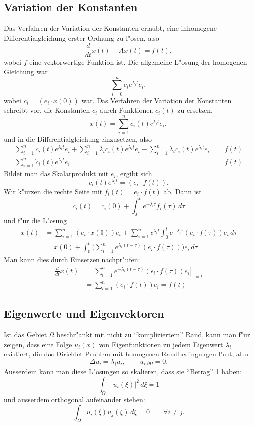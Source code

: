 \subsection{Variation der Konstanten}
Das Verfahren der Variation der Konstanten erlaubt, eine inhomogene
Differentialgleichung erster Ordnung zu l"osen, also
\[
\frac{d}{dt}x(t)-Ax(t)=f(t),
\]
wobei $f$ eine vektorwertige Funktion ist.
Die allgemeine L"osung der homogenen Gleichung war
\[
\sum_{i=0}^nc_ie^{\lambda_i t}e_i,
\]
wobei $c_i=(e_i\cdot x(0))$ war.
Das Verfahren der Variation der Konstanten schreibt vor, die Konstanten
$c_i$ durch Funktionen $c_i(t)$ zu ersetzen,
\[
x(t)=\sum_{i=1}^nc_i(t)e^{\lambda_it}e_i,
\]
und in die Differentialgleichung
einzusetzen, also
\begin{align*}
\sum_{i=1}^n\dot c_i(t)e^{\lambda_it}e_i
+
\sum_{i=1}^n\lambda_i c_i(t)e^{\lambda_it}e_i
-\sum_{i=1}^n\lambda_i c_i(t)e^{\lambda_it}e_i
&=
f(t)
\\
\sum_{i=1}^n\dot c_i(t)e^{\lambda_it}e_i
&=
f(t)
\end{align*}
Bildet man das Skalarprodukt mit $e_i$, ergibt sich 
\[
\dot c_i(t)e^{\lambda_i t}=(e_i\cdot f(t)).
\]
Wir k"urzen die rechte Seite mit $f_i(t)=e_i\cdot f(t)$ ab.
Dann ist
\[
c_i(t)=c_i(0)+\int_0^te^{-\lambda_i \tau}f_i(\tau)\,d\tau
\]
und f"ur die L"osung
\begin{align*}
x(t)&=
\sum_{i=1}^n
(e_i\cdot x(0))e_i+
\sum_{i=1}^ne^{\lambda_i t}\int_0^te^{-\lambda_i \tau}(e_i\cdot f(\tau))e_i\,d\tau
\\
&=
x(0)
+
\int_0^t
\biggl(
\sum_{i=1}^n
e^{\lambda_i(t- \tau)}(e_i\cdot f(\tau))\biggr)e_i\,d\tau
\end{align*}
Man kann dies durch Einsetzen nachpr"ufen:
\begin{align*}
\frac{d}{dt}x(t)
&=
\sum_{i=1}^n\left.e^{-\lambda_i (t-\tau)}(e_i\cdot f(\tau))e_i \right|_{\tau=t}
\\
&=
\sum_{i=1}^n(e_i\cdot f(t))e_i=f(t)
\end{align*}

\subsection{Eigenwerte und Eigenvektoren}
Ist das Gebiet $\Omega$ beschr"ankt mit nicht zu ``kompliziertem'' Rand,
kann man f"ur zeigen, dass eine Folge $u_i(x)$
von Eigenfunktionen zu jedem Eigenwert $\lambda_i$ existiert,
die das Dirichlet-Problem mit homogenen
Randbedingungen l"ost, also
\[
\Delta u_i=\lambda_iu_i,\qquad u_{i|\partial\Omega} = 0.
\]
Ausserdem kann man diese L"osungen so skalieren, dass sie ``Betrag'' 1 haben:
\[
\int_{\Omega}|u_i(\xi)|^2\,d\xi=1
\]
und ausserdem orthogonal aufeinander stehen:
\[
\int_{\Omega}u_i(\xi)u_j(\xi)\,d\xi=0\qquad\forall i\ne j.
\]

